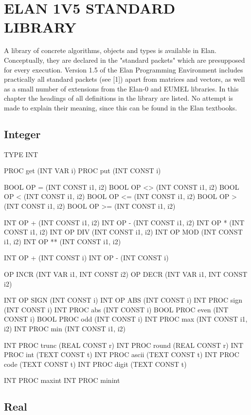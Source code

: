\chapter{ELAN 1V5 STANDARD LIBRARY}

A library of concrete algorithms, objects and types is available in Elan.
Conceptually, they are declared in the "standard packets" which are
presupposed for every execution.
Version 1.5 of the Elan Programming Environment includes practically all
standard packets (see [1]) apart from matrices and
vectors, as well as a small number of extensions from the Elan-0 and EUMEL
libraries. In this chapter the headings of all definitions in the library
are listed. No attempt is made to explain their meaning, since this can
be found in the Elan textbooks.

\section{Integer}

\begin{elan}
TYPE INT

PROC get (INT VAR i)
PROC put (INT CONST i)

BOOL OP = (INT CONST i1, i2)
BOOL OP <> (INT CONST i1, i2)
BOOL OP < (INT CONST i1, i2)
BOOL OP <= (INT CONST i1, i2)
BOOL OP > (INT CONST i1, i2)
BOOL OP >= (INT CONST i1, i2)

INT OP + (INT CONST i1, i2)
INT OP - (INT CONST i1, i2)
INT OP * (INT CONST i1, i2)
INT OP DIV (INT CONST i1, i2)
INT OP MOD (INT CONST i1, i2)
INT OP ** (INT CONST i1, i2)

INT OP + (INT CONST i)
INT OP - (INT CONST i)

OP INCR (INT VAR i1, INT CONST i2)
OP DECR (INT VAR i1, INT CONST i2)

INT OP SIGN (INT CONST i)
INT OP ABS (INT CONST i)
INT PROC sign (INT CONST i)
INT PROC abs (INT CONST i)
BOOL PROC even (INT CONST i)
BOOL PROC odd (INT CONST i)
INT PROC max (INT CONST i1, i2)
INT PROC min (INT CONST i1, i2)

INT PROC trunc (REAL CONST r)
INT PROC round (REAL CONST r)
INT PROC int (TEXT CONST t)
INT PROC ascii (TEXT CONST t)
INT PROC code (TEXT CONST t)
INT PROC digit (TEXT CONST t)

INT PROC maxint
INT PROC minint
\end{elan}

\section{Real}

